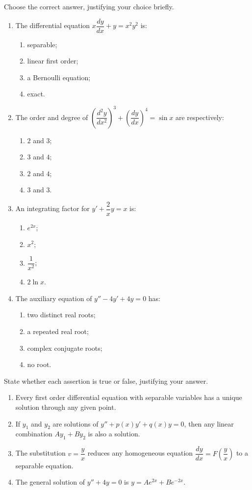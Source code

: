 \documentclass[11pt]{article}
\begin{document}
\begin{exercice}
Choose the correct answer, justifying your choice briefly.
\begin{enumerate}
\item The differential equation $x\dfrac{dy}{dx} + y = x^2 y^2$ is:
\begin{enumerate}
\item separable; \item linear first order; \item a Bernoulli equation; \item exact.
\end{enumerate}
\item The order and degree of $\left(\dfrac{d^2y}{dx^2}\right)^3 + \left(\dfrac{dy}{dx}\right)^4 = \sin x$ are respectively:
\begin{enumerate}
\item $2$ and $3$; \item $3$ and $4$; \item $2$ and $4$; \item $3$ and $3$.
\end{enumerate}
\item An integrating factor for $y' + \dfrac{2}{x}y = x$ is:
\begin{enumerate}
\item $e^{2x}$; \item $x^2$; \item $\dfrac{1}{x^2}$; \item $2\ln x$.
\end{enumerate}
\item The auxiliary equation of $y'' - 4y' + 4y = 0$ has:
\begin{enumerate}
\item two distinct real roots; \item a repeated real root; \item complex conjugate roots; \item no root.
\end{enumerate}
\end{enumerate}
\end{exercice}

\begin{exercice}
State whether each assertion is true or false, justifying your answer.
\begin{enumerate}
\item Every first order differential equation with separable variables has a unique solution through any given point.
\item If $y_1$ and $y_2$ are solutions of $y'' + p(x)y' + q(x)y = 0$, then any linear combination $Ay_1 + By_2$ is also a solution.
\item The substitution $v = \dfrac{y}{x}$ reduces any homogeneous equation $\dfrac{dy}{dx} = F\!\left(\dfrac{y}{x}\right)$ to a separable equation.
\item The general solution of $y'' + 4y = 0$ is $y = Ae^{2x} + Be^{-2x}$.
\end{enumerate}
\end{exercice}
\end{document}

